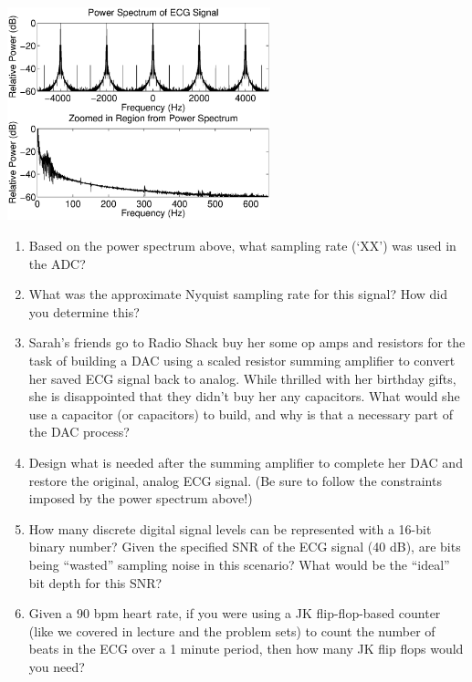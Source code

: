 \documentclass[12pt]{article}
\begin{document}
\begin{center}
\includegraphics[width=3.0in]{ecg_sampling_fft.eps}
\end{center}

\begin{enumerate}
\item Based on the power spectrum above, what sampling rate (`XX') 
was used in the ADC?
\item What was the approximate Nyquist sampling rate for this signal?  How did
you determine this?
\item Sarah's friends go to Radio Shack buy her some op amps and resistors for
the task of building a DAC using a scaled resistor summing amplifier to convert
her saved ECG signal back to analog.  While thrilled with her birthday gifts,
she is disappointed that they didn't buy her any capacitors.  What would she
use a capacitor (or capacitors) to build, and why is that a necessary part of
the DAC process?
\item Design what is needed after the summing amplifier to complete her DAC and
restore the original, analog ECG signal.  (Be sure to follow the constraints
imposed by the power spectrum above!)
\item How many discrete digital signal levels can be represented with a 16-bit
binary number?  Given the specified SNR of the ECG signal (40 dB), are bits
being ``wasted'' sampling noise in this scenario?  What would be the ``ideal''
bit depth for this SNR?
\item Given a 90 bpm heart rate, if you were using a JK flip-flop-based counter
(like we covered in lecture and the problem sets) to count the number of beats
in the ECG over a 1 minute period, then how many JK flip flops would you need?
\end{enumerate}

\clearpage



\clearpage


\end{document}
